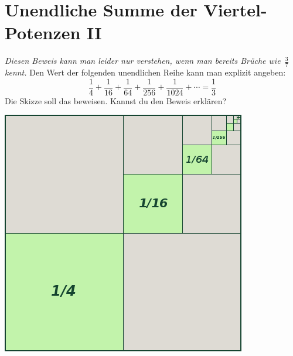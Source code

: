\documentclass{../zirkelblatt}
\begin{document}
\section*{Unendliche Summe der Viertel-Potenzen II}
\emph{Diesen Beweis kann man leider nur verstehen, wenn man bereits Brüche
wie~$\frac{3}{7}$ kennt.}
Den Wert der folgenden unendlichen Reihe kann man
explizit angeben:
\[ \frac{1}{4} + \frac{1}{16} + \frac{1}{64} +
\frac{1}{256} + \frac{1}{1024} + \cdots = \frac{1}{3} \]
Die Skizze soll das beweisen. Kannst du den Beweis erklären?
\begin{center}
\includegraphics[scale=0.5]{geometrische-reihe-2}
\end{center}


\vfill
\end{document}

